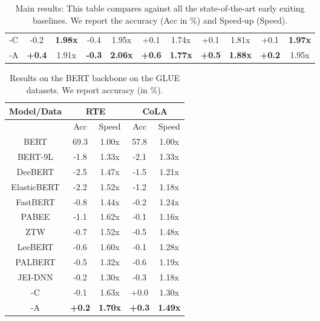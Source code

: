 \begin{table*}[]
\begin{tabular}{ccccccccccc}
\hline
\algo{}-C                    & -0.2         & \textbf{1.98x}          & -0.4          & 1.95x          & +0.1            & 1.74x          & {+0.1}         & 1.81x          & +0.1            & \textbf{1.97x}          \\
\algo{}-A & \textbf{+0.4}   & 1.91x & \textbf{-0.3} & \textbf{2.06x} & \textbf{+0.6} & \textbf{1.77x} & \textbf{+0.5} & \textbf{1.88x} & \textbf{+0.2} & 1.95x \\ \hline
\end{tabular}
\caption{Main results: This table compares \algo{} against all the state-of-the-art early exiting baselines. We report the accuracy (Acc in \%) and Speed-up (Speed).}
\label{tab: results1}
\end{table*}
\begin{table}  %
\centering
\small
\begin{tabular}{ccccc}
\hline
\textbf{Model/Data}      & \multicolumn{2}{c}{\textbf{RTE}} & \multicolumn{2}{c}{\textbf{CoLA}} \\ \hline
                         & Acc             & Speed       & Acc             & Speed        \\ \hline
BERT                     & 69.3            & 1.00x       & 57.8            & 1.00x        \\
BERT-9L                  & -1.8            & 1.33x       & -2.1            & 1.33x        \\ \hline
DeeBERT                  & -2.5            & 1.47x       & -1.5            & 1.21x        \\
ElasticBERT              & -2.2            & 1.52x       & -1.2            & 1.18x        \\
FastBERT                 & -0.8            & 1.44x       & -0.2            & 1.24x        \\
PABEE                    & -1.1            & 1.62x       & -0.1            & 1.16x        \\
ZTW                      & -0.7            & 1.52x       & -0.5            & 1.48x        \\
LeeBERT                  & -0.6            & 1.60x       & -0.1            & 1.28x        \\
PALBERT                  & -0.5            & 1.32x       & -0.6            & 1.19x        \\
JEI-DNN                    & -0.2            & 1.30x       & -0.3            & 1.18x        \\
\hline
\algo{}-C                & -0.1            & 1.63x       & +0.0            & 1.30x        \\
\algo{}-A                & \textbf{+0.2}   & \textbf{1.70x} & \textbf{+0.3}  & \textbf{1.49x} \\ \hline
\end{tabular}
\caption{Results on the BERT backbone on the GLUE datasets. We report accuracy (in $\%$).}
\label{tab: results2}
\vspace{-0.5cm}
\end{table}

